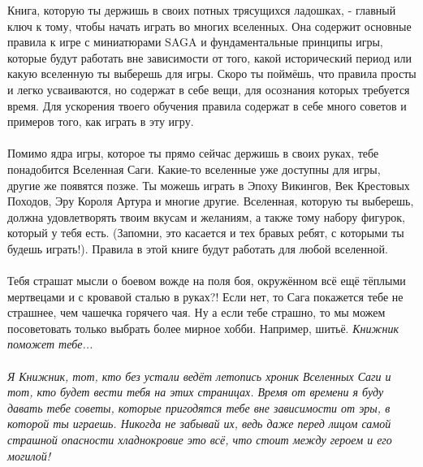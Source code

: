 \documentclass[a4paper,11pt,twoside]{article}
\begin{document}
Книга, которую ты держишь в своих потных трясущихся ладошках, - главный ключ к тому, чтобы начать играть во многих вселенных. Она содержит основные правила к игре с миниатюрами SAGA и фундаментальные принципы игры, которые будут работать вне зависимости от того, какой исторический период или какую вселенную ты выберешь для игры. Скоро ты поймёшь, что правила просты и легко усваиваются, но содержат в себе вещи, для осознания которых требуется время. Для ускорения твоего обучения правила содержат в себе много советов и примеров того, как играть в эту игру.\\ \\
Помимо ядра игры, которое ты прямо сейчас держишь в своих руках, тебе понадобится Вселенная Саги. Какие-то вселенные уже доступны для игры, другие же появятся позже. Ты можешь играть в Эпоху Викингов, Век Крестовых Походов, Эру Короля Артура и многие другие. Вселенная, которую ты выберешь, должна удовлетворять твоим вкусам и желаниям, а также тому набору фигурок, который у тебя есть. (Запомни, это касается и тех бравых ребят, с которыми ты будешь играть!). Правила в этой книге будут работать для любой вселенной.\\ \\
Тебя страшат мысли о боевом вожде на поля боя, окружённом всё ещё тёплыми мертвецами и с кровавой сталью в руках?! Если нет, то Сага покажется тебе не страшнее, чем чашечка горячего чая. Ну а если тебе страшно, то мы можем посоветовать только выбрать более мирное хобби. Например, шитьё. 
\newpage
\begingroup
\fontsize{15pt}{11pt}\selectfont
\textit{Книжник поможет тебе...}\\ \\
\fontsize{11pt}{11pt}\selectfont
\textit{Я Книжник, тот, кто без устали ведёт летопись хроник Вселенных Саги и тот, кто будет вести тебя на этих страницах. Время от времени я буду давать тебе советы, которые пригодятся тебе вне зависимости от эры, в которой ты играешь. Никогда не забывай их, ведь даже перед лицом самой страшной опасности хладнокровие это всё, что стоит между героем и его могилой!}
\endgroup 
\end{document}
